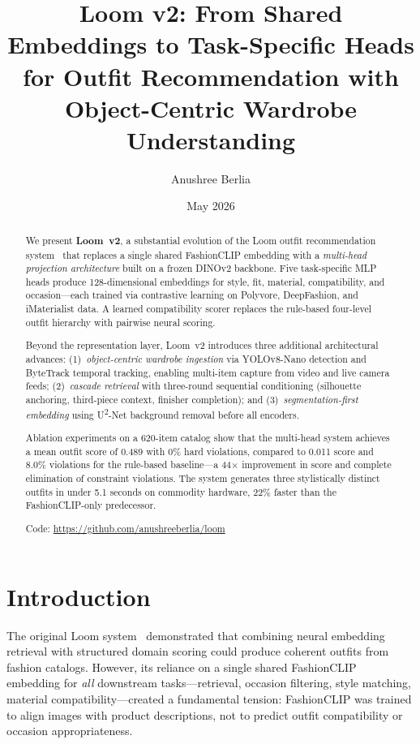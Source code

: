 \documentclass[10pt,twocolumn]{article}
\title{Loom v2: From Shared Embeddings to Task-Specific Heads\\for Outfit Recommendation with\\Object-Centric Wardrobe Understanding}
\author{
  Anushree Berlia
}
\date{May 2026}
\begin{document}
\maketitle

\begin{abstract}
We present \textbf{Loom~v2}, a substantial evolution of the Loom outfit
recommendation system~\citep{berlia2026loom} that replaces a single shared
FashionCLIP embedding with a \emph{multi-head projection architecture}
built on a frozen DINOv2 backbone.  Five task-specific MLP heads produce
128-dimensional embeddings for style, fit, material, compatibility, and
occasion---each trained via contrastive learning on Polyvore, DeepFashion,
and iMaterialist data.  A learned compatibility scorer replaces the
rule-based four-level outfit hierarchy with pairwise neural scoring.

Beyond the representation layer, Loom~v2 introduces three additional
architectural advances:
(1)~\emph{object-centric wardrobe ingestion} via YOLOv8-Nano detection and
ByteTrack temporal tracking, enabling multi-item capture from video and
live camera feeds;
(2)~\emph{cascade retrieval} with three-round sequential conditioning
(silhouette anchoring, third-piece context, finisher completion); and
(3)~\emph{segmentation-first embedding} using U\textsuperscript{2}-Net
background removal before all encoders.

Ablation experiments on a 620-item catalog show that the multi-head system
achieves a mean outfit score of 0.489 with 0\% hard violations, compared
to 0.011 score and 8.0\% violations for the rule-based baseline---a
44$\times$ improvement in score and complete elimination of constraint
violations.  The system generates three stylistically distinct outfits in
under 5.1 seconds on commodity hardware, 22\% faster than the
FashionCLIP-only predecessor.

\smallskip\noindent
Code: \url{https://github.com/anushreeberlia/loom}
\end{abstract}

\section{Introduction}
\label{sec:intro}

The original Loom system~\citep{berlia2026loom} demonstrated that
combining neural embedding retrieval with structured domain scoring could
produce coherent outfits from fashion catalogs.  However, its reliance on
a single shared FashionCLIP~\citep{chia2022fashionclip} embedding for
\emph{all} downstream tasks---retrieval, occasion filtering, style
matching, material compatibility---created a fundamental tension:
FashionCLIP was trained to align images with product descriptions, not to
predict outfit compatibility or occasion appropriateness.
\end{document}
